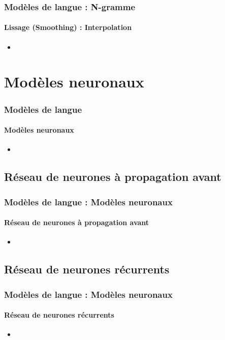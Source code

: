 \documentclass[xcolor=table]{beamer}
\begin{document}
\begin{frame}
\frametitle{Modèles de langue : N-gramme}
\framesubtitle{Lissage (Smoothing) : Interpolation}

\begin{itemize}
	\item 
\end{itemize}

\end{frame}


\section{Modèles neuronaux}

\begin{frame}
\frametitle{Modèles de langue}
\framesubtitle{Modèles neuronaux}

\begin{itemize}
	\item 
\end{itemize}

\end{frame}

\subsection{Réseau de neurones à propagation avant}

\begin{frame}
\frametitle{Modèles de langue : Modèles neuronaux}
\framesubtitle{Réseau de neurones à propagation avant}

\begin{itemize}
	\item 
\end{itemize}

\end{frame}

\subsection{Réseau de neurones récurrents}

\begin{frame}
\frametitle{Modèles de langue : Modèles neuronaux}
\framesubtitle{Réseau de neurones récurrents}

\begin{itemize}
	\item 
\end{itemize}

\end{frame}
\end{document}
